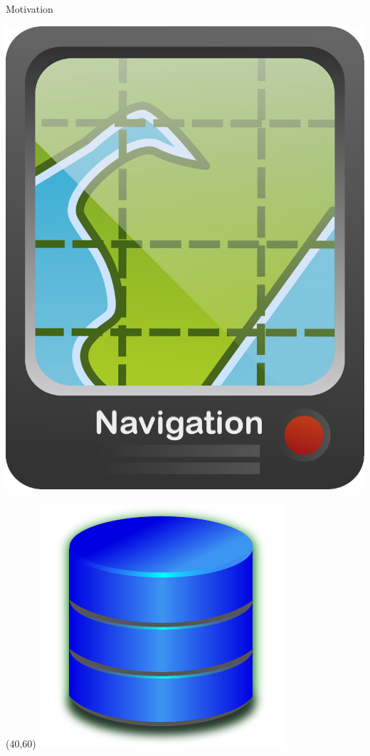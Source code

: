 \documentclass{beamer}
\begin{document}
\begin{frame}[t]{Motivation}
\begin{textblock}{10}
	\includegraphics[width=1\linewidth]{gps}
\end{textblock}
\begin{textblock}{25}(40,60)
	\includegraphics[width=1\linewidth]{db}
\end{textblock}
\end{frame}
\end{document}
